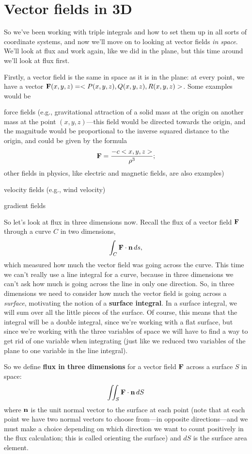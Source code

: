 \section{Vector fields in 3D}

So we've been working with triple integrals and how to set them up in all sorts of coordinate systems, and now we'll move on to looking at vector fields \textit{in space}. We'll look at flux and work again, like we did in the plane, but this time around we'll look at flux first.

Firstly, a vector field is the same in space as it is in the plane: at every point, we have a vector $\boldsymbol{\mathbf{F}}(x,y,z) = <P(x,y,z),Q(x,y,z),R(x,y,z)>$. Some examples would be
\bit
\item force fields (e.g., gravitational attraction of a solid mass at the origin on another mass at the point $(x,y,z)$---this field would be directed towards the origin, and the magnitude would be proportional to the inverse squared distance to the origin, and could be given by the formula
\[\boldsymbol{\mathbf{F}} = \frac{-c<x,y,z>}{\rho^3}; \]
other fields in physics, like electric and magnetic fields, are also examples)
\item velocity fields (e.g., wind velocity)
\item gradient fields 
\eit

So let's look at flux in three dimensions now. Recall the flux of a vector field $\boldsymbol{\mathbf{F}}$ through a curve $C$ in two dimensions,
\[ \int_C \boldsymbol{\mathbf{F}} \cdot \boldsymbol{\mathbf{n}}\,ds, \]
which measured how much the vector field was going across the curve. This time we can't really use a line integral for a curve, because in three dimensions we can't ask how much is going across the line in only one direction. So, in three dimensions we need to consider how much the vector field is going across a \textit{surface}, motivating the notion of a \textbf{surface integral}. In a surface integral, we will sum over all the little pieces of the surface. Of course, this means that the integral will be a double integral, since we're working with a flat surface, but since we're working with the three variables of space we will have to find a way to get rid of one variable when integrating (just like we reduced two variables of the plane to one variable in the line integral). 

\bdf
So we define \textbf{flux in three dimensions} for a vector field $\boldsymbol{\mathbf{F}}$ across a surface $S$ in space:
\[ \iint_S \boldsymbol{\mathbf{F}} \cdot \boldsymbol{\mathbf{n}}\,dS \]
where $\boldsymbol{\mathbf{n}}$ is the unit normal vector to the surface at each point (note that at each point we have two normal vectors to choose from---in opposite directions---and we must make a choice depending on which direction we want to count positively in the flux calculation; this is called orienting the surface) and $dS$ is the surface area element.

